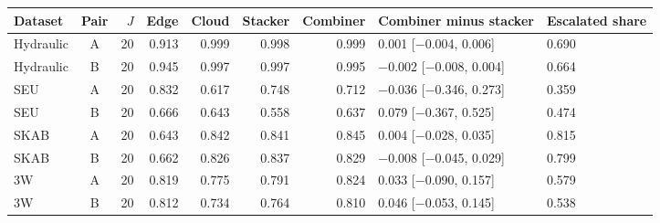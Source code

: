 \begin{tabular}{@{}l c r rrrr l l@{}}
\toprule
Dataset & Pair & $J$ & Edge & Cloud & Stacker & Combiner & Combiner minus stacker & Escalated share \\
\midrule
Hydraulic & A & 20 & 0.913 & 0.999 & 0.998 & 0.999 & 0.001 [$-$0.004, 0.006] & 0.690 \\
Hydraulic & B & 20 & 0.945 & 0.997 & 0.997 & 0.995 & $-$0.002 [$-$0.008, 0.004] & 0.664 \\
SEU & A & 20 & 0.832 & 0.617 & 0.748 & 0.712 & $-$0.036 [$-$0.346, 0.273] & 0.359 \\
SEU & B & 20 & 0.666 & 0.643 & 0.558 & 0.637 & 0.079 [$-$0.367, 0.525] & 0.474 \\
SKAB & A & 20 & 0.643 & 0.842 & 0.841 & 0.845 & 0.004 [$-$0.028, 0.035] & 0.815 \\
SKAB & B & 20 & 0.662 & 0.826 & 0.837 & 0.829 & $-$0.008 [$-$0.045, 0.029] & 0.799 \\
3W & A & 20 & 0.819 & 0.775 & 0.791 & 0.824 & 0.033 [$-$0.090, 0.157] & 0.579 \\
3W & B & 20 & 0.812 & 0.734 & 0.764 & 0.810 & 0.046 [$-$0.053, 0.145] & 0.538 \\
\bottomrule
\end{tabular}
